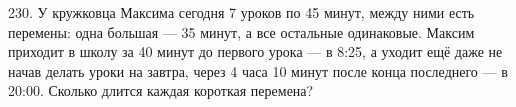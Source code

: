 230. У кружковца Максима сегодня 7 уроков по 45 минут, между ними есть перемены: одна большая --- 35 минут, а все остальные одинаковые. Максим приходит в школу за 40 минут до первого урока --- в 8:25, а уходит ещё даже не начав делать уроки на завтра, через 4 часа 10 минут после конца последнего --- в 20:00. Сколько длится каждая короткая перемена?\\
